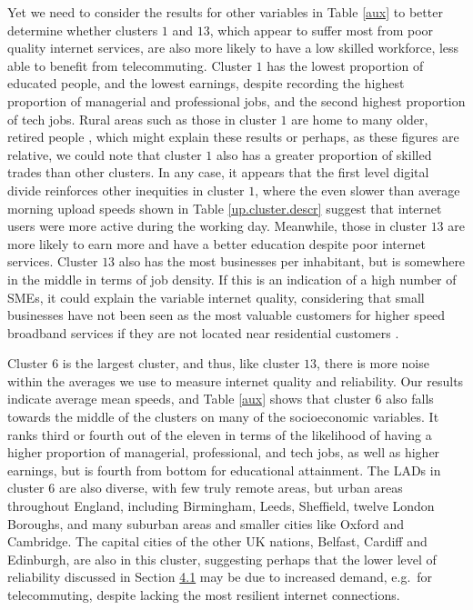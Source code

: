 \documentclass[Royal,times,sageh]{sagej}
\begin{document}
Yet we need to consider the results for other variables in Table
\ref{aux} to better determine whether clusters \(1\) and \(13\), which
appear to suffer most from poor quality internet services, are also more
likely to have a low skilled workforce, less able to benefit from
telecommuting. Cluster \(1\) has the lowest proportion of educated
people, and the lowest earnings, despite recording the highest
proportion of managerial and professional jobs, and the second highest
proportion of tech jobs. Rural areas such as those in cluster \(1\) are
home to many older, retired people \citep{blank2018local}, which might
explain these results or perhaps, as these figures are relative, we
could note that cluster \(1\) also has a greater proportion of skilled
trades than other clusters. In any case, it appears that the first level
digital divide reinforces other inequities in cluster \(1\), where the
even slower than average morning upload speeds shown in Table
\ref{up.cluster.descr} suggest that internet users were more active
during the working day. Meanwhile, those in cluster \(13\) are more
likely to earn more and have a better education despite poor internet
services. Cluster \(13\) also has the most businesses per inhabitant,
but is somewhere in the middle in terms of job density. If this is an
indication of a high number of SMEs, it could explain the variable
internet quality, considering that small businesses have not been seen
as the most valuable customers for higher speed broadband services if
they are not located near residential customers \citep{ofcom2016}.

Cluster \(6\) is the largest cluster, and thus, like cluster \(13\),
there is more noise within the averages we use to measure internet
quality and reliability. Our results indicate average mean speeds, and
Table \ref{aux} shows that cluster \(6\) also falls towards the middle
of the clusters on many of the socioeconomic variables. It ranks third
or fourth out of the eleven in terms of the likelihood of having a
higher proportion of managerial, professional, and tech jobs, as well as
higher earnings, but is fourth from bottom for educational attainment.
The LADs in cluster \(6\) are also diverse, with few truly remote areas,
but urban areas throughout England, including Birmingham, Leeds,
Sheffield, twelve London Boroughs, and many suburban areas and smaller
cities like Oxford and Cambridge. The capital cities of the other UK
nations, Belfast, Cardiff and Edinburgh, are also in this cluster,
suggesting perhaps that the lower level of reliability discussed in
Section \protect\hyperlink{sec:4.1}{4.1} may be due to increased demand,
e.g.~for telecommuting, despite lacking the most resilient internet
connections.
\end{document}
